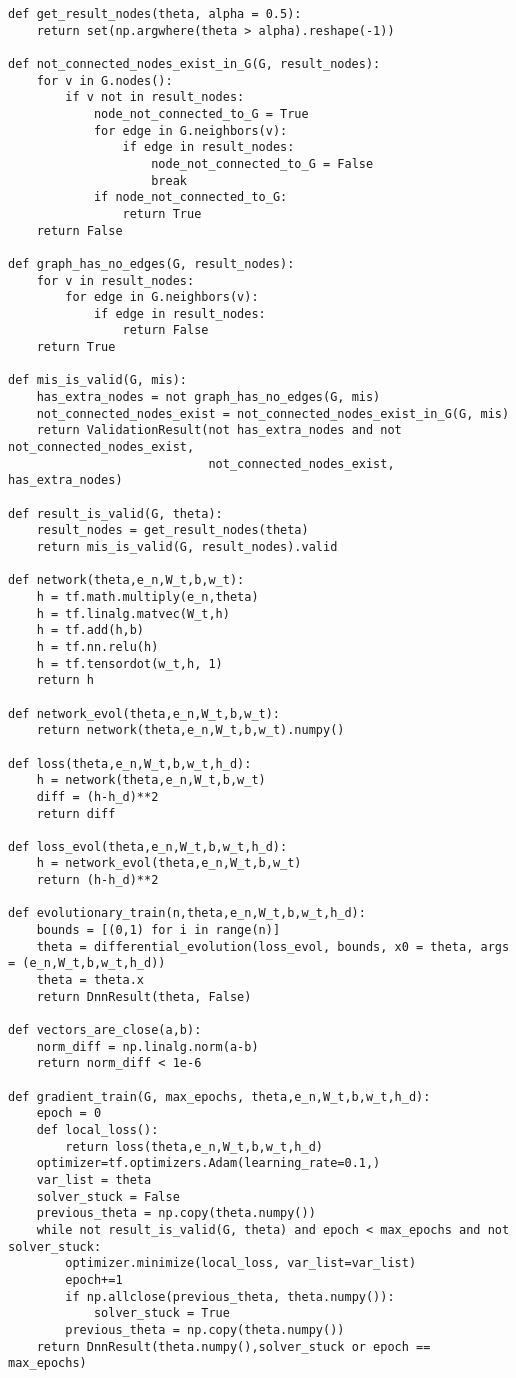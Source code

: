 \begin{lstlisting}
def get_result_nodes(theta, alpha = 0.5):
    return set(np.argwhere(theta > alpha).reshape(-1))

def not_connected_nodes_exist_in_G(G, result_nodes):
    for v in G.nodes():
        if v not in result_nodes:
            node_not_connected_to_G = True
            for edge in G.neighbors(v):
                if edge in result_nodes:
                    node_not_connected_to_G = False
                    break
            if node_not_connected_to_G:
                return True
    return False
            
def graph_has_no_edges(G, result_nodes):
    for v in result_nodes:
        for edge in G.neighbors(v):
            if edge in result_nodes:
                return False
    return True

def mis_is_valid(G, mis):
    has_extra_nodes = not graph_has_no_edges(G, mis)
    not_connected_nodes_exist = not_connected_nodes_exist_in_G(G, mis)
    return ValidationResult(not has_extra_nodes and not not_connected_nodes_exist,
                            not_connected_nodes_exist, has_extra_nodes)
               
def result_is_valid(G, theta):
    result_nodes = get_result_nodes(theta)
    return mis_is_valid(G, result_nodes).valid

def network(theta,e_n,W_t,b,w_t):
    h = tf.math.multiply(e_n,theta)
    h = tf.linalg.matvec(W_t,h)
    h = tf.add(h,b)
    h = tf.nn.relu(h)
    h = tf.tensordot(w_t,h, 1)
    return h
    
def network_evol(theta,e_n,W_t,b,w_t):
    return network(theta,e_n,W_t,b,w_t).numpy()

def loss(theta,e_n,W_t,b,w_t,h_d):
    h = network(theta,e_n,W_t,b,w_t)
    diff = (h-h_d)**2   
    return diff

def loss_evol(theta,e_n,W_t,b,w_t,h_d):
    h = network_evol(theta,e_n,W_t,b,w_t)
    return (h-h_d)**2  

def evolutionary_train(n,theta,e_n,W_t,b,w_t,h_d):
    bounds = [(0,1) for i in range(n)]
    theta = differential_evolution(loss_evol, bounds, x0 = theta, args = (e_n,W_t,b,w_t,h_d))
    theta = theta.x
    return DnnResult(theta, False)

def vectors_are_close(a,b):
    norm_diff = np.linalg.norm(a-b)
    return norm_diff < 1e-6 

def gradient_train(G, max_epochs, theta,e_n,W_t,b,w_t,h_d):
    epoch = 0
    def local_loss():
        return loss(theta,e_n,W_t,b,w_t,h_d)
    optimizer=tf.optimizers.Adam(learning_rate=0.1,)
    var_list = theta
    solver_stuck = False
    previous_theta = np.copy(theta.numpy())
    while not result_is_valid(G, theta) and epoch < max_epochs and not solver_stuck:
        optimizer.minimize(local_loss, var_list=var_list)
        epoch+=1
        if np.allclose(previous_theta, theta.numpy()):
            solver_stuck = True
        previous_theta = np.copy(theta.numpy())
    return DnnResult(theta.numpy(),solver_stuck or epoch == max_epochs)


\end{lstlisting}
